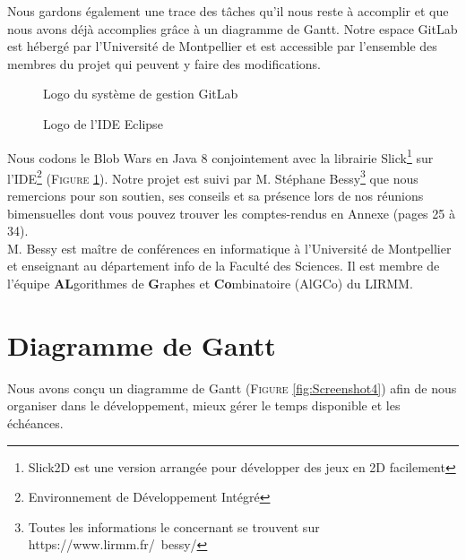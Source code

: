 \documentclass[11pt,a4paper]{article}
\begin{document}
Nous gardons également une trace des tâches qu'il nous reste à accomplir et que nous avons déjà accomplies grâce à un diagramme de Gantt. Notre espace GitLab est hébergé par l'Université de Montpellier et est accessible par l'ensemble des membres du projet qui peuvent y faire des modifications.\\

\newpage

\begin{figure}[h]
 \begin{minipage}{.45\linewidth}
  \centering{}
\caption{Logo du système de gestion GitLab \label{fig:Logo1}}
 \end{minipage} \hfill
 \begin{minipage}{.47\linewidth}
 \vspace{21px}
  \centering{}
  \caption{Logo de l'IDE Eclipse \label{fig:eclipse}}
 \end{minipage}
\end{figure}

\vspace{20px}

Nous codons le Blob Wars en Java 8 conjointement avec la librairie Slick\footnote{Slick2D est une version arrangée pour développer des jeux en 2D facilement} sur l'IDE\footnote{Environnement de Développement Intégré} (\textsc{Figure} \ref{fig:eclipse}). Notre projet est suivi par M. Stéphane Bessy\footnote{Toutes les informations le concernant se trouvent sur https://www.lirmm.fr/~bessy/} que nous remercions pour son soutien, ses conseils et sa présence lors de nos réunions bimensuelles dont vous pouvez trouver les comptes-rendus en Annexe (pages 25 à 34).\\

M. Bessy est maître de conférences en informatique à l’Université de Montpellier et enseignant au département info de la Faculté des Sciences. Il est membre de l'équipe \textbf{AL}gorithmes de \textbf{G}raphes et \textbf{Co}mbinatoire (AlGCo) du LIRMM.

\vspace{13px}

\section{Diagramme de Gantt}

Nous avons conçu un diagramme de Gantt (\textsc{Figure} \ref{fig:Screenshot4}) afin de nous organiser dans le développement, mieux gérer le temps disponible et les échéances.
\end{document}
